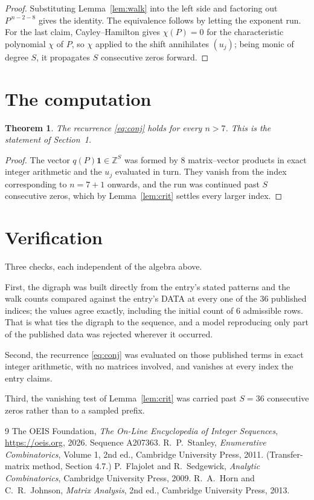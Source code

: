 \documentclass[11pt,a4paper]{article}
\theoremstyle{plain}
\newtheorem{theorem}{Theorem}
\theoremstyle{definition}
\begin{document}
\begin{proof}
Substituting Lemma~\ref{lem:walk} into the left side and factoring out
$P^{\,n-2-8}$ gives the identity. The equivalence follows by letting the exponent
run. For the last claim, Cayley--Hamilton gives $\chi(P)=0$ for the characteristic
polynomial $\chi$ of $P$, so $\chi$ applied to the shift annihilates $(u_j)$; being monic of
degree $S$, it propagates $S$ consecutive zeros forward.
\end{proof}

\section{The computation}

\begin{theorem}
The recurrence \eqref{eq:conj} holds for every $n>7$. This is the statement of
Section~1.
\end{theorem}

\begin{proof}
The vector $q(P)\mathbf{1}\in\mathbb{Z}^{S}$ was formed by $8$ matrix--vector
products in exact integer arithmetic and the $u_j$ evaluated in turn. They vanish from the
index corresponding to $n=7+1$ onwards, and the run was continued past $S$ consecutive
zeros, which by Lemma~\ref{lem:crit} settles every larger index.
\end{proof}

\section{Verification}

Three checks, each independent of the algebra above.

First, the digraph was built directly from the entry's stated patterns and the walk counts
compared against the entry's DATA at every one of the $36$ published indices; the
values agree exactly, including the initial count of $6$ admissible rows. That is
what ties the digraph to the sequence, and a model reproducing only part of the published
data was rejected wherever it occurred.

Second, the recurrence \eqref{eq:conj} was evaluated on those published terms in exact
integer arithmetic, with no matrices involved, and vanishes at every index the entry claims.

Third, the vanishing test of Lemma~\ref{lem:crit} was carried past $S=36$ consecutive
zeros rather than to a sampled prefix.

\begin{thebibliography}{9}
 The OEIS Foundation, \emph{The On-Line Encyclopedia of Integer
Sequences}, \url{https://oeis.org}, 2026. Sequence A207363.
 R.~P.~Stanley, \emph{Enumerative Combinatorics}, Volume 1, 2nd ed.,
Cambridge University Press, 2011. (Transfer-matrix method, Section 4.7.)
 P.~Flajolet and R.~Sedgewick, \emph{Analytic Combinatorics}, Cambridge
University Press, 2009.
 R.~A.~Horn and C.~R.~Johnson, \emph{Matrix Analysis}, 2nd ed., Cambridge
University Press, 2013.
\end{thebibliography}
\end{document}
